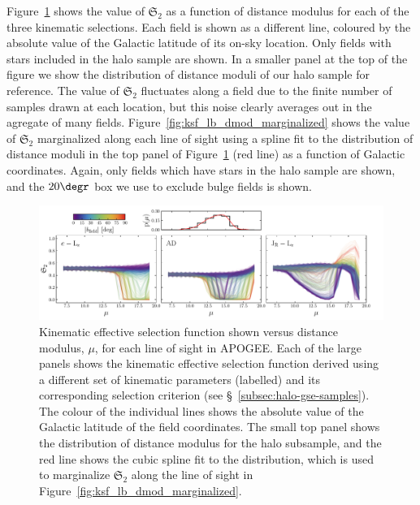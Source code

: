 Figure~\ref{fig:ksf_dmod_fields} shows the value of $\mathfrak{S}_{2}$ as a function of distance modulus for each of the three kinematic selections. Each field is shown as a different line, coloured by the absolute value of the Galactic latitude of its on-sky location. Only fields with stars included in the halo sample are shown. In a smaller panel at the top of the figure we show the distribution of distance moduli of our halo sample for reference. The value of $\mathfrak{S}_{2}$ fluctuates along a field due to the finite number of samples drawn at each location, but this noise clearly averages out in the agregate of many fields. Figure~\ref{fig:ksf_lb_dmod_marginalized} shows the value of $\mathfrak{S}_{2}$ marginalized along each line of sight using a spline fit to the distribution of distance moduli in the top panel of Figure~\ref{fig:ksf_dmod_fields} (red line) as a function of Galactic coordinates. Again, only fields which have stars in the halo sample are shown, and the $20\degr$ box we use to exclude bulge fields is shown. 


\begin{figure}
    \centering
    \includegraphics[width=\textwidth]{figure/ch3/ksf_dmod_fields.pdf}
    \caption{Kinematic effective selection function shown versus distance modulus, $\mu$, for each line of sight in APOGEE. Each of the large panels shows the kinematic effective selection function derived using a different set of kinematic parameters (labelled) and its corresponding selection criterion (see \S~\ref{subsec:halo-gse-samples}). The colour of the individual lines shows the absolute value of the Galactic latitude of the field coordinates. The small top panel shows the distribution of distance modulus for the halo subsample, and the red line shows the cubic spline fit to the distribution, which is used to marginalize $\mathfrak{S}_\mathrm{2}$ along the line of sight in Figure~\ref{fig:ksf_lb_dmod_marginalized}.}
    \label{fig:ksf_dmod_fields}
\end{figure}


